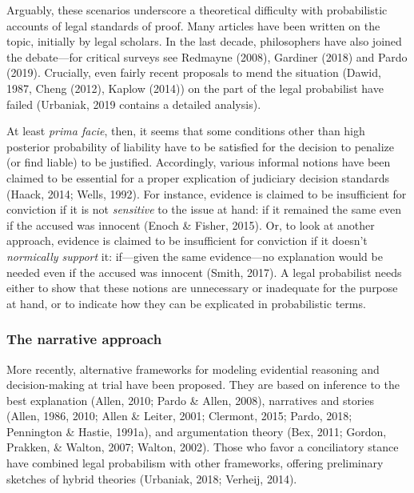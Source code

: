 \documentclass[11pt,dvipsnames,enabledeprecatedfontcommands]{scrartcl}
\begin{document}
Arguably, these scenarios underscore a theoretical difficulty with
probabilistic accounts of legal standards of proof. Many articles have
been written on the topic, initially by legal scholars. In the last
decade, philosophers have also joined the debate---for critical surveys
see Redmayne (2008), Gardiner (2018) and Pardo (2019). Crucially, even
fairly recent proposals to mend the situation (Dawid, 1987, Cheng
(2012), Kaplow (2014)) on the part of the legal probabilist have failed
(Urbaniak, 2019 contains a detailed analysis).

At least \emph{prima facie}, then, it seems that some conditions other
than high posterior probability of liability have to be satisfied for
the decision to penalize (or find liable) to be justified. Accordingly,
various informal notions have been claimed to be essential for a proper
explication of judiciary decision standards (Haack, 2014; Wells, 1992).
For instance, evidence is claimed to be insufficient for conviction if
it is not \emph{sensitive} to the issue at hand: if it remained the same
even if the accused was innocent (Enoch \& Fisher, 2015). Or, to look at
another approach, evidence is claimed to be insufficient for conviction
if it doesn't \emph{normically support} it: if---given the same
evidence---no explanation would be needed even if the accused was
innocent (Smith, 2017). A legal probabilist needs either to show that
these notions are unnecessary or inadequate for the purpose at hand, or
to indicate how they can be explicated in probabilistic terms.

\subsubsection{The narrative approach}\label{the-narrative-approach}

More recently, alternative frameworks for modeling evidential reasoning
and decision-making at trial have been proposed. They are based on
inference to the best explanation (Allen, 2010; Pardo \& Allen, 2008),
narratives and stories (Allen, 1986, 2010; Allen \& Leiter, 2001;
Clermont, 2015; Pardo, 2018; Pennington \& Hastie, 1991a), and
argumentation theory (Bex, 2011; Gordon, Prakken, \& Walton, 2007;
Walton, 2002). Those who favor a conciliatory stance have combined legal
probabilism with other frameworks, offering preliminary sketches of
hybrid theories (Urbaniak, 2018; Verheij, 2014).
\end{document}
